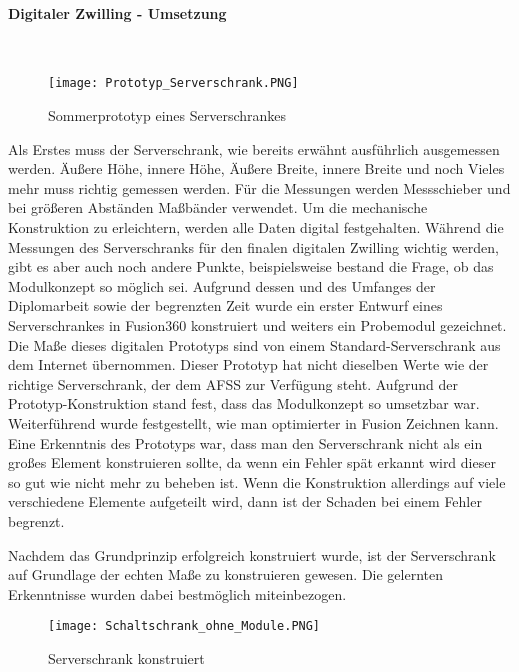    \paragraph{Digitaler Zwilling - Umsetzung}\mbox{}\\ 

    \begin{figure}[h]
        \centering
        \texttt{[image: Prototyp\_Serverschrank.PNG]}
        \caption{Sommerprototyp eines Serverschrankes}
        \label{fig:Sommerprototyp}
    \end{figure}
    Als Erstes muss der Serverschrank, wie bereits erwähnt ausführlich ausgemessen werden. Äußere Höhe, innere Höhe, Äußere Breite, innere Breite und noch Vieles mehr muss richtig gemessen werden.    
    Für die Messungen werden Messschieber und bei größeren Abständen Maßbänder verwendet. Um die mechanische Konstruktion zu erleichtern, werden alle Daten digital festgehalten.   
    Während die Messungen des Serverschranks für den finalen digitalen Zwilling wichtig werden, gibt es aber auch noch andere Punkte, beispielsweise bestand die Frage, ob das Modulkonzept so möglich sei. Aufgrund dessen und des Umfanges der Diplomarbeit sowie der begrenzten Zeit wurde ein erster Entwurf eines Serverschrankes in Fusion360 konstruiert und weiters ein Probemodul gezeichnet. Die Maße dieses digitalen Prototyps sind von einem Standard-Serverschrank aus dem Internet übernommen.
    Dieser Prototyp hat nicht dieselben Werte wie der richtige Serverschrank, der dem AFSS zur Verfügung steht. Aufgrund der Prototyp-Konstruktion stand fest, dass das Modulkonzept so umsetzbar war. Weiterführend wurde festgestellt, wie man optimierter in Fusion Zeichnen kann.
    Eine Erkenntnis des Prototyps war, dass man den Serverschrank nicht als ein großes Element konstruieren sollte, da wenn ein Fehler spät erkannt wird dieser so gut wie nicht mehr zu beheben ist. Wenn die Konstruktion allerdings auf viele verschiedene Elemente aufgeteilt wird, dann ist der Schaden bei einem Fehler begrenzt. 

    Nachdem das Grundprinzip erfolgreich konstruiert wurde, ist der Serverschrank auf Grundlage der echten Maße zu konstruieren gewesen. Die gelernten Erkenntnisse wurden dabei bestmöglich miteinbezogen.\\    
    \begin{figure}[h]
        \centering
        \texttt{[image: Schaltschrank\_ohne\_Module.PNG]} 
        \caption{Serverschrank konstruiert}
        \label{fig:Clean_Serverschrank}
    \end{figure}

